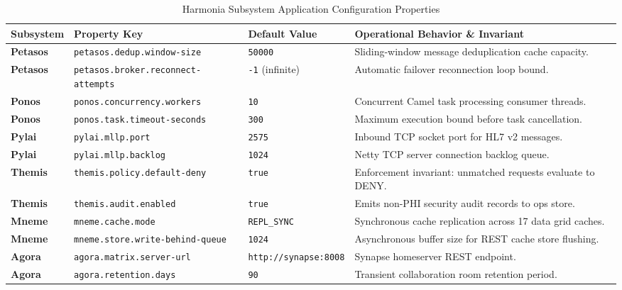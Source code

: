 \begin{table}[htbp]
\centering
\scriptsize
\begin{tabularx}{\textwidth}{l P{3.8cm} P{3.5cm} Y}
\toprule
\textbf{Subsystem} & \textbf{Property Key} & \textbf{Default Value} & \textbf{Operational Behavior \& Invariant} \\
\midrule
\textbf{Petasos} & \nolinkurl{petasos.dedup.window-size} & \texttt{50000} & Sliding-window message deduplication cache capacity. \\
\textbf{Petasos} & \nolinkurl{petasos.broker.reconnect-attempts} & \texttt{-1} (infinite) & Automatic failover reconnection loop bound. \\
\addlinespace
\textbf{Ponos} & \nolinkurl{ponos.concurrency.workers} & \texttt{10} & Concurrent Camel task processing consumer threads. \\
\textbf{Ponos} & \nolinkurl{ponos.task.timeout-seconds} & \texttt{300} & Maximum execution bound before task cancellation. \\
\addlinespace
\textbf{Pylai} & \nolinkurl{pylai.mllp.port} & \texttt{2575} & Inbound TCP socket port for HL7 v2 messages. \\
\textbf{Pylai} & \nolinkurl{pylai.mllp.backlog} & \texttt{1024} & Netty TCP server connection backlog queue. \\
\addlinespace
\textbf{Themis} & \nolinkurl{themis.policy.default-deny} & \texttt{true} & Enforcement invariant: unmatched requests evaluate to DENY. \\
\textbf{Themis} & \nolinkurl{themis.audit.enabled} & \texttt{true} & Emits non-PHI security audit records to ops store. \\
\addlinespace
\textbf{Mneme} & \nolinkurl{mneme.cache.mode} & \texttt{REPL\_SYNC} & Synchronous cache replication across 17 data grid caches. \\
\textbf{Mneme} & \nolinkurl{mneme.store.write-behind-queue} & \texttt{1024} & Asynchronous buffer size for REST cache store flushing. \\
\addlinespace
\textbf{Agora} & \nolinkurl{agora.matrix.server-url} & \nolinkurl{http://synapse:8008} & Synapse homeserver REST endpoint. \\
\textbf{Agora} & \nolinkurl{agora.retention.days} & \texttt{90} & Transient collaboration room retention period. \\
\bottomrule
\end{tabularx}
\caption{Harmonia Subsystem Application Configuration Properties}
\label{tab:app_config_subsystems}
\end{table}

\newpage
